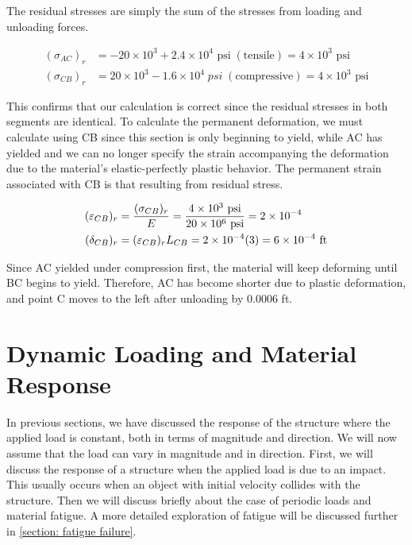 \documentclass[
10pt,
a4paper,
openany,
svgnames,
]{kaobook} %
\begin{document}
\begin{solution}
  The residual stresses are simply the sum of the stresses from loading and unloading forces.
  
  \begin{align*}
    ({\sigma _{AC}})_r &=  - 20 \times {10^3} + 2.4 \times {10^4} \text{ psi}\;({\text{tensile}}) = 4 \times 10^3 \text{ psi}  \\
    ({\sigma _{CB}})_r &= 20 \times {10^3} - 1.6 \times {10^4}\;psi\;({\text{compressive}}) = 4 \times 10^3 \text{ psi}
  \end{align*}	
  
  This confirms that our calculation is correct since the residual stresses in both segments are identical.
  To calculate the permanent deformation, we must calculate using CB since this section is only beginning to yield, while AC has yielded and we can no longer specify the strain accompanying the deformation due to the material’s elastic-perfectly plastic behavior. The permanent strain associated with CB is that resulting from residual stress.
  
  \begin{align*}
    (\varepsilon_{CB})_r &= \frac{(\sigma_{CB})_r}{E} = \frac{4 \times 10^3 \text{ psi}}{20 \times 10^6 \text{ psi}} = 2 \times 10^{-4} \hfill \\
    (\delta _{CB})_r &= (\varepsilon_{CB})_rL_{CB} = 2 \times 10^{-4}(3) = 6 \times 10^{-4} \text{ ft} \hfill 
  \end{align*}	
  
  Since AC yielded under compression first, the material will keep deforming until BC begins to yield. Therefore, AC has become shorter due to plastic deformation, and point C moves to the left after unloading by 0.0006 ft.
  
\end{solution}

\section{Dynamic Loading and Material Response}

In previous sections, we have discussed the response of the structure where the applied load is constant, both in terms of magnitude and direction. We will now assume that the load can vary in magnitude and in direction. First, we will discuss the response of a structure when the applied load is due to an impact. This usually occurs when an object with initial velocity collides with the structure. Then we will discuss briefly about the case of periodic loads and material fatigue. A more detailed exploration of fatigue will be discussed further in \cref{section: fatigue failure}.
\end{document}
